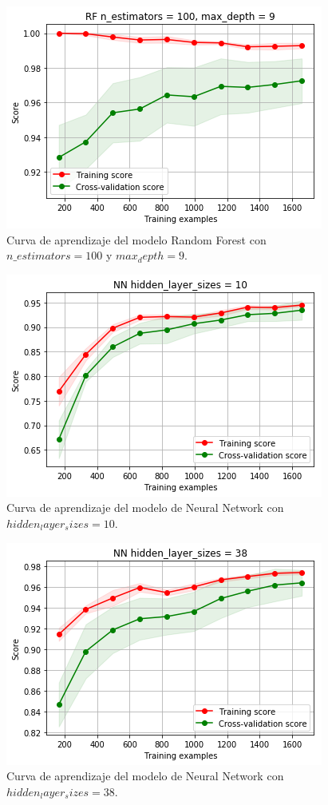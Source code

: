 \documentclass[11pt,a4paper]{article}
\begin{document}
\begin{figure}[H]
    \centering
    \includegraphics[scale=0.7]{img/lc-rf-n-100-d-9.png}
    \caption{Curva de aprendizaje del modelo Random Forest con $n\_estimators=100$ y $max_depth=9$.}
    \label{fig:lc-rf-n-100-d-9}
\end{figure}

\begin{figure}[H]
    \centering
    \includegraphics[scale=0.7]{img/lc-nn-10.png}
    \caption{Curva de aprendizaje del modelo de Neural Network con $hidden_layer_sizes=10$.}
    \label{fig:lc-nn-10}
\end{figure}

\begin{figure}[H]
    \centering
    \includegraphics[scale=0.7]{img/lc-nn-38.png}
    \caption{Curva de aprendizaje del modelo de Neural Network con $hidden_layer_sizes=38$.}
    \label{fig:lc-nn-38}
\end{figure}
\end{document}
